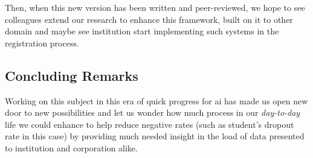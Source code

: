 \documentclass[../main.tex]{subfiles}
\begin{document}
Then, when this new version has been written and peer-reviewed, we hope to see colleagues extend our research to enhance this framework, built on it to other domain and maybe see institution start implementing such systems in the registration process. 

\subsection{Concluding Remarks}
Working on this subject in this era of quick progress for \acrshort{ai} has made us open new door to new possibilities and let us wonder how much process in our \textit{day-to-day} life we could enhance to help reduce negative rates (such as student's dropout rate in this case) by providing much needed insight in the load of data presented to institution and corporation alike. 
\end{document}
